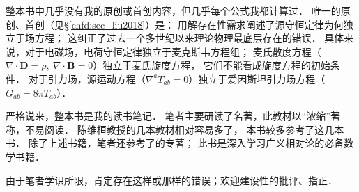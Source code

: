 {\kaishu
    整本书中几乎没有我的原创或首创内容，但几乎每个公式我都计算过．
    唯一的原创、首创\cite{liu2018}（见\S\ref{chfd:sec_liu2018}）是：  
    用解存在性需求阐述了源守恒定律为何独立于场方程；
    这纠正了过去一个多世纪以来理论物理最底层存在的错误．
    具体来说，对于电磁场，电荷守恒定律独立于麦克斯韦方程组；
    麦氏散度方程（$\nabla\cdot \boldsymbol{D}=\rho,\ \nabla \cdot \boldsymbol{B}=0$）独立于麦氏旋度方程，
    它们不能看成旋度方程的初始条件．
    对于引力场，源运动方程（$\nabla^a T_{ab}=0$）独立于爱因斯坦引力场方程（$G_{ab}=8\pi T_{ab}$）．
}


严格说来，整本书是我的读书笔记．
笔者主要研读了\textcite{cc2001-zh}名著，此教材以“浓缩”著称，不易阅读．
陈维桓教授的几本教材\cite{chenwh2001,chen-li-2023-2ed-v1}相对容易多了，  %
本书较多参考了这几本书．
除了上述书籍，笔者还参考了\textcite{oneill1983}的专著；
此书是深入学习广义相对论的必备数学书籍．



由于笔者学识所限，肯定存在这样或那样的错误；欢迎建设性的批评、指正．

%    



\printbibliography[heading=subbibliography,title=参考文献]


\endinput


